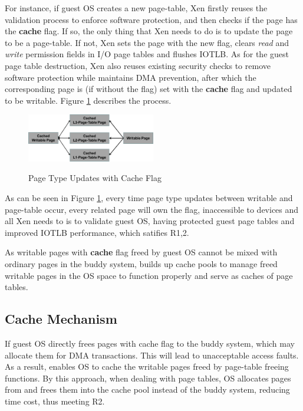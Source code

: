 For instance, if guest OS creates a new page-table, Xen firstly reuses the validation process to enforce software protection, and then checks if the page has the \textbf{cache} flag. If so, the only thing that Xen needs to do is to update the page to be a page-table. If not, Xen sets the page with the new flag, clears \emph{read} and \emph{write} permission fields in I/O page tables and flushes IOTLB. As for the guest page table destruction, Xen also reuses existing security checks to remove software protection while maintains DMA prevention, after which the corresponding page is (if without the flag) set with the \textbf{cache} flag and updated to be writable. Figure \ref{fig:cache-flag} describes the process.

\begin{figure}[ht]
\centering
\includegraphics[width=0.5\textwidth]{image/overview/page-type-updates-with-cache-flag.png} \\
\caption{Page Type Updates with Cache Flag}
\label{fig:cache-flag}
\end{figure}

As can be seen in Figure \ref{fig:cache-flag}, every time page type updates between writable and page-table occur, every related page will own the flag, inaccessible to devices and all Xen needs to is to validate guest OS, having protected guest page tables and improved IOTLB performance, which satifies R1,2.

As writable pages with \textbf{cache} flag freed by guest OS cannot be mixed with ordinary pages in the buddy system, \name builds up cache pools to manage freed writable pages in the OS space to function properly and serve as caches of page tables.

\subsection{Cache Mechanism}
If guest OS directly frees pages with cache flag to the buddy system, which may allocate them for DMA transactions. This will lead to unacceptable access faults. As a result, \name enables OS to cache the writable pages freed by page-table freeing functions. By this approach, when dealing with page tables, OS allocates pages from and frees them into the cache pool instead of the buddy system, reducing time cost, thus meeting R2.

